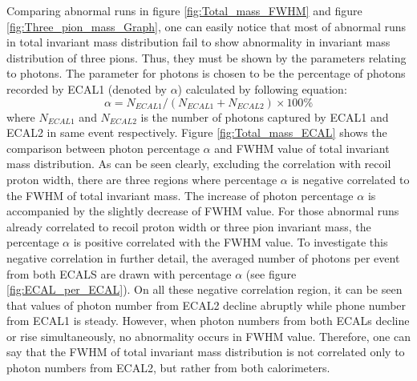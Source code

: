 Comparing abnormal runs in figure \ref{fig:Total_mass_FWHM} and figure \ref{fig:Three_pion_mass_Graph}, one can easily notice that most of abnormal runs in total invariant mass distribution fail to show abnormality in invariant mass distribution of three pions. Thus, they must be shown by the parameters relating to photons. The parameter for photons is chosen to be the percentage of photons recorded by ECAL1 (denoted by $\alpha$) calculated by following equation:
\begin{equation}
\alpha = N_{ECAL1}/\left(N_{ECAL1}+N_{ECAL2}\right) \times 100\%
\end{equation}
where $N_{ECAL1}$ and $N_{ECAL2}$ is the number of photons captured by ECAL1 and ECAL2 in same event respectively. Figure \ref{fig:Total_mass_ECAL} shows the comparison between photon percentage $\alpha$ and FWHM value of total invariant mass distribution. As can be seen clearly, excluding the correlation with recoil proton width, there are three regions where percentage $\alpha$ is negative correlated to the FWHM of total invariant mass. The increase of photon percentage $\alpha$ is accompanied by the slightly decrease of FWHM value. For those abnormal runs already correlated to recoil proton width or three pion invariant mass, the percentage $\alpha$ is positive correlated with the FWHM value. To investigate this negative correlation in further detail, the averaged number of photons per event from both ECALS are drawn with percentage $\alpha$ (see figure \ref{fig:ECAL_per_ECAL}). On all these negative correlation region, it can be seen that values of photon number from ECAL2 decline abruptly while phone number from ECAL1 is steady. However, when photon numbers from both ECALs decline or rise simultaneously, no abnormality occurs in FWHM value. Therefore, one can say that the FWHM of total invariant mass distribution is not correlated only to photon numbers from ECAL2, but rather from both calorimeters.
